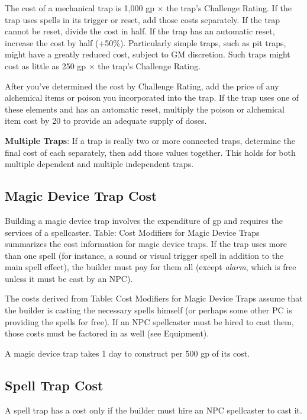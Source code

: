 				
The cost of a mechanical trap is 1,000 gp \mbox{$\times$} the trap's Challenge Rating. If the trap uses spells in its trigger or reset, add those costs separately. If the trap cannot be reset, divide the cost in half. If the trap has an automatic reset, increase the cost by half (+50\%). Particularly simple traps, such as pit traps, might have a greatly reduced cost, subject to GM discretion. Such traps might cost as little as 250 gp \mbox{$\times$} the trap's Challenge Rating.
				
After you've determined the cost by Challenge Rating, add the price of any alchemical items or poison you incorporated into the trap. If the trap uses one of these elements and has an automatic reset, multiply the poison or alchemical item cost by 20 to provide an adequate supply of doses.
				
\textbf{Multiple Traps}: If a trap is really two or more connected traps, determine the final cost of each separately, then add those values together. This holds for both multiple dependent and multiple independent traps.
				
\subsection{Magic Device Trap Cost}

				
Building a magic device trap involves the expenditure of gp and requires the services of a spellcaster. Table: Cost Modifiers for Magic Device Traps summarizes the cost information for magic device traps. If the trap uses more than one spell (for instance, a sound or visual trigger spell in addition to the main spell effect), the builder must pay for them all (except \textit{alarm}, which is free unless it must be cast by an NPC).
				
The costs derived from Table: Cost Modifiers for Magic Device Traps assume that the builder is casting the necessary spells himself (or perhaps some other PC is providing the spells for free). If an NPC spellcaster must be hired to cast them, those costs must be factored in as well (see Equipment).
				
A magic device trap takes 1 day to construct per 500 gp of its cost.
				
\subsection{Spell Trap Cost}

				
A spell trap has a cost only if the builder must hire an NPC spellcaster to cast it.
				
